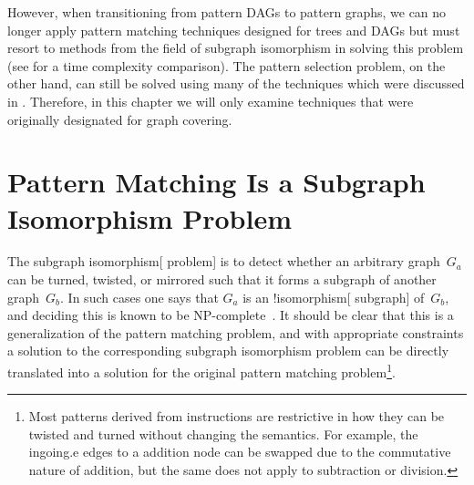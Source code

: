 %

However, when transitioning from \glspl{pattern DAG} to \glspl{pattern graph},
we can no longer apply \gls{pattern matching} techniques designed for
\glspl{tree} and \glspl{DAG} but must resort to methods from the field of
\gls{subgraph isomorphism} in solving this problem (see
 for a time complexity comparison).
%
The
\gls{pattern selection} problem, on the other hand, can still be solved using
many of the techniques which were discussed in
.
%
Therefore, in this chapter we will only examine
techniques that were originally designated for \gls{graph covering}.


\section{Pattern Matching Is a Subgraph Isomorphism Problem}

The \gls{subgraph isomorphism}[ problem] is to detect whether an arbitrary
\gls{graph}~$G_a$ can be turned, twisted, or mirrored such that it forms a
\gls{subgraph} of another \gls{graph}~$G_b$.
%
In such cases one says that $G_a$ is an \glsshort!{isomorphism}[ \gls{subgraph}]
of~$G_b$, and deciding this is known to be NP-complete~\cite{Cook1971}.
%
It should be clear that this is a
generalization of the \gls{pattern matching} problem, and with appropriate
constraints a solution to the corresponding \gls{subgraph isomorphism} problem
can be directly translated into a solution for the original \gls{pattern
  matching} problem\footnote{Most \glspl{pattern} derived from
  \glspl{instruction} are restrictive in how they can be twisted and turned
  without changing the semantics.
%
For example, the \gls{ingoing.e} \glspl{edge} to a addition \gls{node} can be
swapped due to the commutative nature of addition, but the same does not apply
to subtraction or division.}.


